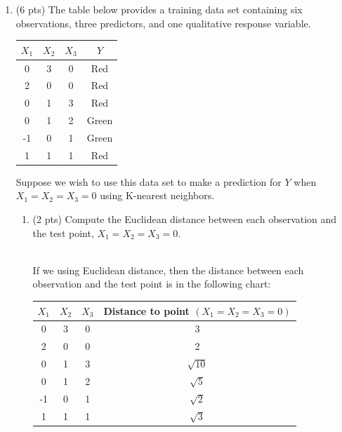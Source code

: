 \documentclass[a4paper]{article}
\theoremstyle{definition}
\newenvironment{soln}{
    \leavevmode\color{blue}\ignorespaces
}{}
\begin{document}
\begin{enumerate}
\begin{enumerate}
\end{enumerate}

\item (6 pts) The table below provides a training data set containing six observations, three predictors, and one qualitative response variable.

\begin{center}
	\begin{tabular}{ c  c  c  c}
		\hline
		$X_{1}$ & $X_{2}$ & $X_{3}$ & $Y$ \\ \hline
		0 & 3 & 0 & Red \\
		2 & 0 & 0 & Red \\
		0 & 1 & 3 & Red \\
		0 & 1 & 2 & Green \\
		-1 & 0 & 1 & Green \\
		1 & 1 & 1 & Red  \\
		\hline
	\end{tabular}
\end{center}

Suppose we wish to use this data set to make a prediction for $Y$ when $X_{1} = X_{2} = X_{3} = 0$ using K-nearest neighbors.

\begin{enumerate}
	\item (2 pts) Compute the Euclidean distance between each observation and the test point, $X_{1} = X_{2} = X_{3}=0$.
 
	\begin{soln}\\
	If we using Euclidean distance, then the distance between each observation and the test point is in the following chart: \\
	\begin{center}
		\begin{tabular}{ c  c  c  c}
			\hline
			$X_{1}$ & $X_{2}$ & $X_{3}$ & Distance to point $(X_{1}=X_{2}=X_{3}=0)$ \\ \hline
			0 & 3 & 0 & 3 \\
			2 & 0 & 0 & 2 \\
			0 & 1 & 3 & $\sqrt{10}$ \\
			0 & 1 & 2 & $\sqrt{5}$ \\
			-1 & 0 & 1 & $\sqrt{2}$ \\
			1 & 1 & 1 & $\sqrt{3}$  \\
			\hline
		\end{tabular}
	\end{center}
	
	\end{soln}
 

\end{enumerate}
\end{enumerate}
\end{document}
